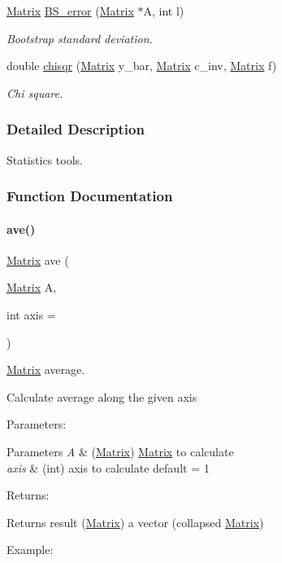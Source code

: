 \begin{DoxyCompactItemize}
\hyperlink{classMatrix}{Matrix} \hyperlink{Stats_8C_ae2e8a930a8ea255b6deb8f17f4d45206}{B\+S\+\_\+error} (\hyperlink{classMatrix}{Matrix} $\ast$A, int l)
\begin{DoxyCompactList}\small\item\em Bootstrap standard deviation. \end{DoxyCompactList}\item 
double \hyperlink{Stats_8C_acf58aad875a53a890de07e717fa561b9}{chisqr} (\hyperlink{classMatrix}{Matrix} y\+\_\+bar, \hyperlink{classMatrix}{Matrix} c\+\_\+inv, \hyperlink{classMatrix}{Matrix} f)
\begin{DoxyCompactList}\small\item\em Chi square. \end{DoxyCompactList}\end{DoxyCompactItemize}


\subsubsection{Detailed Description}
Statistics tools. 



\subsubsection{Function Documentation}
\mbox{\label{Stats_8C_ae39b64f2f2f119f1fd195d6ca0583a6f}} 
\paragraph{\texorpdfstring{ave()}{ave()}}
{\footnotesize\ttfamily \hyperlink{classMatrix}{Matrix} ave (\begin{DoxyParamCaption}\item[{\hyperlink{classMatrix}{Matrix}}]{A,  }\item[{int}]{axis = {} }\end{DoxyParamCaption})}



\hyperlink{classMatrix}{Matrix} average. 

Calculate average along the given axis

Parameters\+: 
\begin{DoxyParams}{Parameters}
{\em A} & (\hyperlink{classMatrix}{Matrix}) \hyperlink{classMatrix}{Matrix} to calculate \\
\hline
{\em axis} & (int) axis to calculate default = 1\\
\hline
\end{DoxyParams}
Returns\+: \begin{DoxyReturn}{Returns}
result (\hyperlink{classMatrix}{Matrix}) a vector (collapsed \hyperlink{classMatrix}{Matrix})
\end{DoxyReturn}
Example\+:


